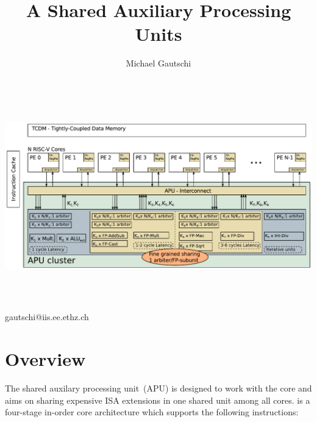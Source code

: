 \documentclass[%
 oneside,      %
 openany,      %
 halfparskip,  %
]{scrbook}
\title{A Shared Auxiliary Processing Units}
\author{Michael Gautschi}
\begin{document}
\makeatletter
\begin{titlepage}

 \thispagestyle{empty}

 \begin{center}

  \begin{spacing}{2.0}
  {\Huge\textbf{\@title}}
  \end{spacing}

  \vspace{0.2cm}

  \vfill

  \includegraphics[height = 8cm]{figures/APU_concept.pdf}

  \vfill

  {\Large \@author}\\
  {gautschi@iis.ee.ethz.ch}
  \vfill
  \@date

 \end{center}
\end{titlepage}
\makeatother

\tableofcontents

\chapter{Overview}

The shared auxilary processing unit~(APU) is designed to work with the \rvcore core and aims on sharing expensive ISA extensions in one shared unit among all cores. \rvcore is a four-stage in-order \riscv core architecture which supports the following instructions:
\end{document}
